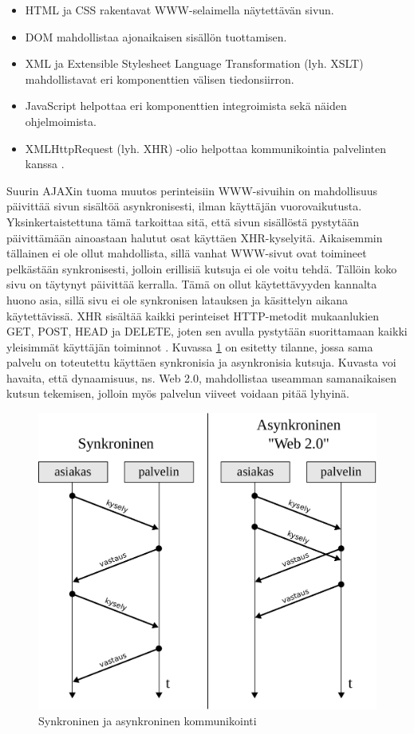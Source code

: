 \begin{itemize}
\item HTML ja CSS rakentavat WWW-selaimella näytettävän sivun.
\item DOM mahdollistaa ajonaikaisen sisällön tuottamisen.
\item XML ja Extensible Stylesheet Language Transformation (lyh. XSLT)
  mahdollistavat eri komponenttien välisen tiedonsiirron.
\item JavaScript helpottaa eri komponenttien integroimista sekä näiden
  ohjelmoimista.
\item XMLHttpRequest (lyh. XHR) -olio helpottaa kommunikointia
  palvelinten kanssa \cite{WEB2b}.
\end{itemize}

Suurin AJAXin tuoma muutos perinteisiin WWW-sivuihin on mahdollisuus
päivittää sivun sisältöä asynkronisesti, ilman käyttäjän
vuorovaikutusta. Yksinkertaistettuna tämä tarkoittaa sitä, että sivun
sisällöstä pystytään päivittämään ainoastaan halutut osat käyttäen
XHR-kyselyitä. Aikaisemmin tällainen ei ole ollut mahdollista, sillä
vanhat WWW-sivut ovat toimineet pelkästään synkronisesti, jolloin
erillisiä kutsuja ei ole voitu tehdä. Tällöin koko sivu on täytynyt
päivittää kerralla. Tämä on ollut käytettävyyden kannalta huono asia,
sillä sivu ei ole synkronisen latauksen ja käsittelyn aikana
käytettävissä. XHR sisältää kaikki perinteiset HTTP-metodit
mukaanlukien GET, POST, HEAD ja DELETE, joten sen avulla pystytään
suorittamaan kaikki yleisimmät käyttäjän toiminnot
\cite{WEB2}. Kuvassa \ref{synkroninen} on esitetty tilanne, jossa sama
palvelu on toteutettu käyttäen synkronisia ja asynkronisia
kutsuja. Kuvasta voi havaita, että dynaamisuus, ns. Web 2.0,
mahdollistaa useamman samanaikaisen kutsun tekemisen, jolloin myös
palvelun viiveet voidaan pitää lyhyinä.

\begin{figure}[htp]
\centering
\includegraphics[width=12cm]{pics/synkroninen.pdf}
\caption{Synkroninen ja asynkroninen kommunikointi}
\label{synkroninen}
\end{figure}

